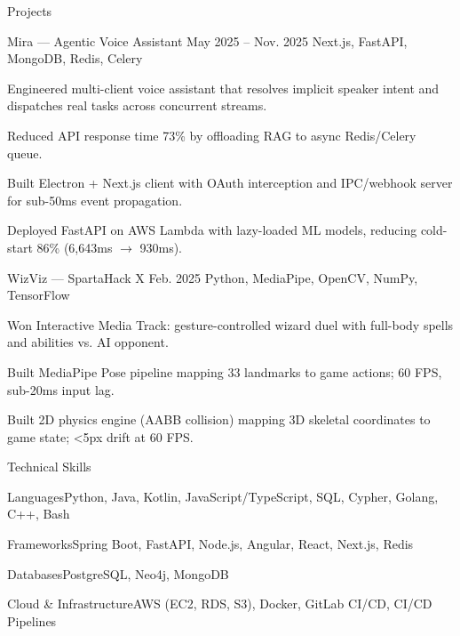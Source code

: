 \documentclass[
	11pt
]{../../../resume}
\begin{document}
	\begin{rSection}{P}{rojects}
		\begin{rSectionEntry}
			{Mira --- Agentic Voice Assistant}
			{May 2025 -- Nov. 2025}
			{}
			{Next.js, FastAPI, MongoDB, Redis, Celery}
			{}

			\item Engineered multi-client voice assistant that resolves implicit speaker intent and dispatches real tasks across concurrent streams.
			\item Reduced API response time 73\% by offloading RAG to async Redis/Celery queue.
			\item Built Electron + Next.js client with OAuth interception and IPC/webhook server for sub-50ms event propagation.
			\item Deployed FastAPI on AWS Lambda with lazy-loaded ML models, reducing cold-start 86\% (6{,}643ms $\rightarrow$ 930ms).
		\end{rSectionEntry}

		\begin{rSectionEntry}
			{WizViz --- SpartaHack X}
			{Feb. 2025}
			{}
			{Python, MediaPipe, OpenCV, NumPy, TensorFlow}
			{}

			\item Won Interactive Media Track: gesture-controlled wizard duel with full-body spells and abilities vs. AI opponent.
			\item Built MediaPipe Pose pipeline mapping 33 landmarks to game actions; 60 FPS, sub-20ms input lag.
			\item Built 2D physics engine (AABB collision) mapping 3D skeletal coordinates to game state; \textless5px drift at 60 FPS.
		\end{rSectionEntry}
	\end{rSection}

	\begin{rSection}{T}{echnical Skills}
		\begin{rSet}{Languages}{Python, Java, Kotlin, JavaScript/TypeScript, SQL, Cypher, Golang, C++, Bash}
		\end{rSet}
		\begin{rSet}{Frameworks}{Spring Boot, FastAPI, Node.js, Angular, React, Next.js, Redis}
		\end{rSet}
		\begin{rSet}{Databases}{PostgreSQL, Neo4j, MongoDB}
		\end{rSet}
		\begin{rSet}{Cloud \& Infrastructure}{AWS (EC2, RDS, S3), Docker, GitLab CI/CD, CI/CD Pipelines}
		\end{rSet}
	\end{rSection}
\end{document}
